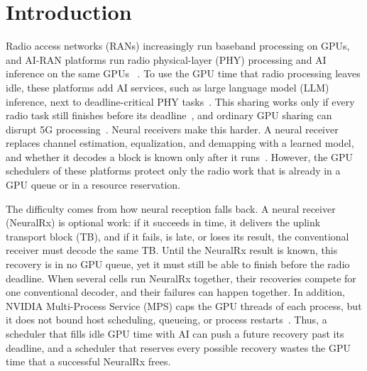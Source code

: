 \documentclass[acmsmall,screen,review,anonymous]{acmart}
\newcommand{\NRx}{NeuralRx\xspace}
\begin{document}
\maketitle

\section{Introduction}

Radio access networks (RANs) increasingly run baseband processing on GPUs, and AI-RAN platforms run
radio physical-layer (PHY) processing and AI inference on the same GPUs
~\cite{aerial,yinyangran,interplay,distributedairan}. To use the GPU time that radio processing leaves
idle, these platforms add AI services, such as large language model (LLM) inference, next to
deadline-critical PHY tasks~\cite{caora,haf}. This sharing works only if every radio task still
finishes before its deadline~\cite{concordia}, and ordinary GPU sharing can disrupt 5G
processing~\cite{yinyangran}. Neural receivers make this harder. A neural receiver replaces channel
estimation, equalization, and demapping with a learned model, and whether it decodes a block is known
only after it runs~\cite{deeprx,nrx5g}. However, the GPU schedulers of these platforms protect only the
radio work that is already in a GPU queue or in a resource reservation.

The difficulty comes from how neural reception falls back. A neural receiver (\NRx) is optional work:
if it succeeds in time, it delivers the uplink transport block (TB), and if it fails, is late, or loses
its result, the conventional receiver must decode the same TB. Until the \NRx result is known, this
recovery is in no GPU queue, yet it must still be able to finish before the radio deadline. When several
cells run \NRx together, their recoveries compete for one conventional decoder, and their failures can
happen together. In addition, NVIDIA Multi-Process Service (MPS) caps the GPU threads of each process,
but it does not bound host scheduling, queueing, or process restarts~\cite{nvidiampS}. Thus, a scheduler
that fills idle GPU time with AI can push a future recovery past its deadline, and a scheduler that
reserves every possible recovery wastes the GPU time that a successful \NRx frees.
\end{document}
